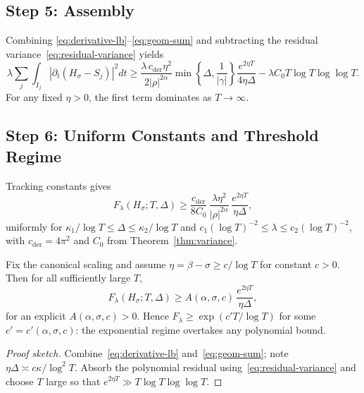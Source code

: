\subsection{Step 5: Assembly}\label{step:assembly}

Combining \eqref{eq:derivative-lb}–\eqref{eq:geom-sum} and
subtracting the residual variance~\eqref{eq:residual-variance} yields
\begin{equation}
\lambda\!\sum_j\!\int_{I_j}\!|\partial_t(H_\sigma-S_j)|^2dt
  \ge \frac{\lambda\,c_{\mathrm{der}}\eta^2}{2|\rho|^{2\alpha}}
        \min\!\left\{\!\Delta,\frac{1}{|\gamma|}\!\right\}
        \frac{e^{2\eta T}}{4\eta\Delta}
   - \lambda C_0 T\log T\log\log T.
\tag{8.5}\label{eq:assembly}
\end{equation}
For any fixed $\eta>0$, the first term dominates as $T\to\infty$.

\subsection{Step 6: Uniform Constants and Threshold Regime}\label{step:uniform}

Tracking constants gives
\begin{equation}
F_\lambda(H_\sigma;T,\Delta)
  \ge \frac{c_{\mathrm{der}}}{8C_0}\,
        \frac{\lambda\eta^2}{|\rho|^{2\alpha}}\,
        \frac{e^{2\eta T}}{\eta\Delta},
\tag{8.6}\label{eq:uniform-lb}
\end{equation}
uniformly for $\kappa_1/\log T \le \Delta \le \kappa_2/\log T$ and
$c_1(\log T)^{-2}\le \lambda \le c_2(\log T)^{-2}$,
with $c_{\mathrm{der}}=4\pi^2$ and $C_0$ from Theorem~\ref{thm:variance}.

\begin{lemma}\label{lem:threshold}
Fix the canonical scaling and assume $\eta=\beta-\sigma\ge c/\log T$ for constant $c>0$.
Then for all sufficiently large $T$,
\[
F_\lambda(H_\sigma;T,\Delta)
   \ge A(\alpha,\sigma,c)\,\frac{e^{2\eta T}}{\eta\Delta},
\]
for an explicit $A(\alpha,\sigma,c)>0$.
Hence $F_\lambda\ge\exp(c' T/\log T)$ for some $c'=c'(\alpha,\sigma,c)$:
the exponential regime overtakes any polynomial bound.
\end{lemma}

\begin{proof}[Proof sketch]
Combine~\eqref{eq:derivative-lb} and~\eqref{eq:geom-sum}; note $\eta\Delta\asymp c\kappa/\log^2 T$.
Absorb the polynomial residual using~\eqref{eq:residual-variance}
and choose $T$ large so that $e^{2\eta T}\gg T\log T\log\log T$.
\end{proof}

